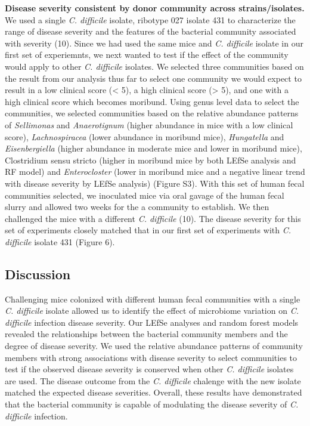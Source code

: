 \documentclass[
  12pt,
]{article}
\begin{document}
\textbf{Disease severity consistent by donor community across
strains/isolates.} We used a single \emph{C. difficile} isolate,
ribotype 027 isolate 431 to characterize the range of disease severity
and the features of the bacterial community associated with severity
(10). Since we had used the same mice and \emph{C. difficile} isolate in
our first set of experiemnts, we next wanted to test if the effect of
the community would apply to other \emph{C. difficile} isolates. We
selected three communities based on the result from our analysis thus
far to select one community we would expect to result in a low clinical
score (\textless{} 5), a high clinical score (\textgreater{} 5), and one
with a high clinical score which becomes moribund. Using genus level
data to select the communities, we selected communities based on the
relative abundance patterns of \emph{Sellimonas} and \emph{Anaerotignum}
(higher abundance in mice with a low clinical score),
\emph{Lachnospiracea} (lower abundance in moribund mice),
\emph{Hungatella} and \emph{Eisenbergiella} (higher abundance in
moderate mice and lower in moribund mice), Clostridium sensu stricto
(higher in moribund mice by both LEfSe analysis and RF model) and
\emph{Enterocloster} (lower in moribund mice and a negative linear trend
with disease severity by LEfSe analysis) (Figure S3). With this set of
human fecal communities selected, we inoculated mice via oral gavage of
the human fecal slurry and allowed two weeks for the a community to
establish. We then challenged the mice with a different \emph{C.
difficile} (10). The disease severity for this set of experiments
closely matched that in our first set of experiments with \emph{C.
difficile} isolate 431 (Figure 6).

\hypertarget{discussion}{%
\subsection{Discussion}\label{discussion}}

Challenging mice colonized with different human fecal communities with a
single \emph{C. difficile} isolate allowed us to identify the effect of
microbiome variation on \emph{C. difficile} infection disease severity.
Our LEfSe analyses and random forest models revealed the relationships
between the bacterial community members and the degree of disease
severity. We used the relative abundance patterns of community members
with strong associations with disease severity to select communities to
test if the observed disease severity is conserved when other \emph{C.
difficile} isolates are used. The disease outcome from the \emph{C.
difficile} chalenge with the new isolate matched the expected disease
severities. Overall, these results have demonstrated that the bacterial
community is capable of modulating the disease severity of \emph{C.
difficile} infection.
\end{document}

